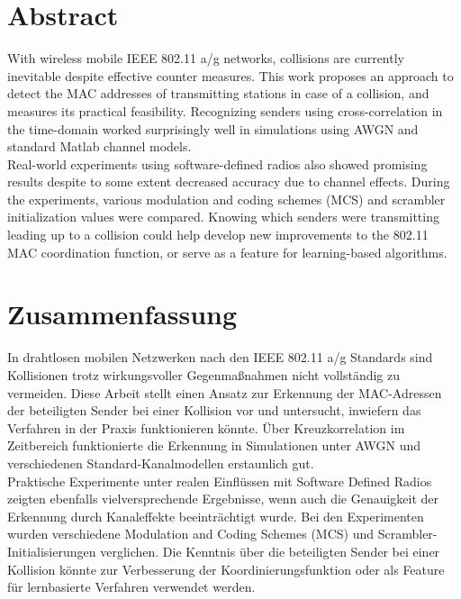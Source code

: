 

\begingroup
\let\clearpage\relax
\let\cleardoublepage\relax
\let\cleardoublepage\relax

\chapter*{Abstract}

With wireless mobile IEEE 802.11 a/g networks, collisions are currently inevitable despite effective counter measures. This work proposes an approach to detect the MAC addresses of transmitting stations in case of a collision, and measures its practical feasibility. Recognizing senders using cross-correlation in the time-domain worked surprisingly well in simulations using AWGN and standard Matlab channel models.\\

Real-world experiments using software-defined radios also showed promising results despite to some extent decreased accuracy due to channel effects. During the experiments, various modulation and coding schemes (MCS) and scrambler initialization values were compared. Knowing which senders were transmitting leading up to a collision could help develop new improvements to the 802.11 MAC coordination function, or serve as a feature for learning-based algorithms.



\vfill
{}
\chapter*{Zusammenfassung}

In drahtlosen mobilen Netzwerken nach den IEEE 802.11 a/g Standards sind Kollisionen trotz wirkungsvoller Gegenmaßnahmen nicht vollständig zu vermeiden. Diese Arbeit stellt einen Ansatz zur Erkennung der MAC-Adressen der beteiligten Sender bei einer Kollision vor und untersucht, inwiefern das Verfahren in der Praxis funktionieren könnte. Über Kreuzkorrelation im Zeitbereich funktionierte die Erkennung in Simulationen unter AWGN und verschiedenen Standard-Kanalmodellen erstaunlich gut.\\

Praktische Experimente unter realen Einflüssen mit Software Defined Radios zeigten ebenfalls vielversprechende Ergebnisse, wenn auch die Genauigkeit der Erkennung durch Kanaleffekte beeinträchtigt wurde. Bei den Experimenten wurden verschiedene Modulation and Coding Schemes (MCS) und Scrambler-Initialisierungen verglichen. Die Kenntnis über die beteiligten Sender bei einer Kollision könnte zur Verbesserung der Koordinierungsfunktion oder als Feature für lernbasierte Verfahren verwendet werden.


\endgroup
\vfill
